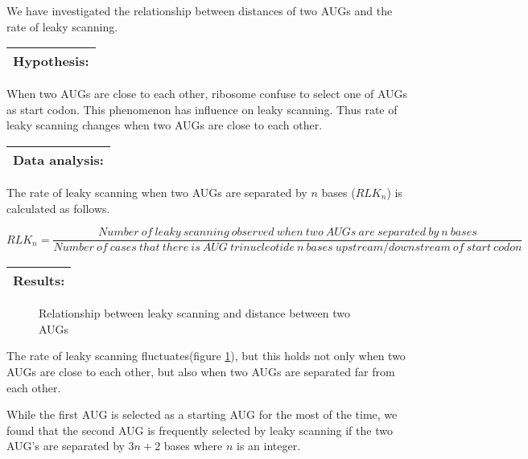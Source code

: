 
We have investigated the relationship between distances of two AUGs
and the rate of leaky scanning.

\vspace{2ex}
\noindent
\begin{tabular}{|l|}
\hline
Hypothesis:\\
\hline
\end{tabular}

When two AUGs are close to each other, ribosome confuse to select
one of AUGs as start codon. This phenomenon has influence on leaky
scanning. 
Thus rate of leaky scanning changes when two AUGs are close to each other.

\vspace{2ex}
\noindent
\begin{tabular}{|l|}
\hline
Data analysis:\\
\hline
\end{tabular}

The rate of leaky scanning when two AUGs are separated by \(n\) bases
(\(RLK_{n}\)) is calculated as follows.

\begin{small}
\begin{displaymath}
RLK_{n} = \frac{Number\:of\:leaky\:scanning\:observed\:when\:two\:AUGs\:
are\:separated\:by\:n\:bases}{Number\:of
\:cases\:that\:there\:is\:AUG\:trinucleotide\:n\:bases\:
upstream/downstream\:of\:start\:codon}
\end{displaymath}
\end{small}

\vspace{2ex}
\noindent
\begin{tabular}{|l|}
\hline
Results:\\
\hline
\end{tabular}

\begin{figure}
\begin{center}
\end{center}
\caption{Relationship between leaky scanning and distance between two AUGs}
\label{leak_bun}
\end{figure}

The rate of leaky scanning fluctuates(figure \ref{leak_bun}), but this holds
not only when 
two AUGs are close to each other, but also when two AUGs are separated
far from each other.

While the first AUG is selected as a
starting AUG for the most of the time, we found that the second AUG is
frequently selected by leaky scanning if the two AUG's are
separated by \(3n+2\) bases where \(n\) is an integer.  

